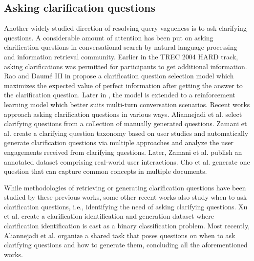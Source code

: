 \documentclass[format=acmsmall, review=False, screen=true]{acmart}
\begin{document}
\subsection{\textbf{Asking clarification questions}} Another widely studied direction of resolving query vagueness is to ask clarifying questions. A considerable amount of attention has been put on asking clarification questions in conversational search by natural language processing and information retrieval community. Earlier in the TREC 2004 HARD track\cite{trechard}, asking clarifications was permitted for participants to get additional information. Rao and Daumé III in \cite{raodaume2018} propose a clarification question selection model which maximizes the expected value of perfect information after getting the answer to the clarification question. Later in \cite{raodaume2019}, the model is extended to a reinforcement learning model which better suits multi-turn conversation scenarios. Recent works approach asking clarification questions in various ways. Aliannejadi et al. \cite{askingcq} select clarifying questions from a collection of manually generated questions. Zamani et al. \cite{zamania} create a clarifying question taxonomy based on user studies and automatically generate clarification questions via multiple approaches and \cite{zamani2020engagement} analyze the user engagements received from clarifying questions. Later, Zamani et al. \cite{zamani2020mimics} publish an annotated dataset comprising real-world user interactions. Cho et al. \cite{askingcqnlgmulti} generate one question that can capture common concepts in multiple documents. 

While methodologies of retrieving or generating clarification questions have been studied by these previous works, some other recent works also study when to ask clarification questions, i.e., identifying the need of asking clarifying questions. Xu et al. \cite{xuasking2019} create a clarification identification and generation dataset where clarification identification is cast as a binary classification problem. Most recently, Aliannejadi et al. \cite{aliannejadi2020convai3} organize a shared task that poses questions on when to ask clarifying questions and how to generate them, concluding all the aforementioned works. 
\end{document}
